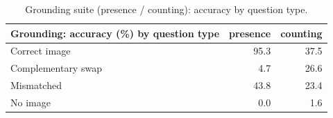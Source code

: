\begin{table}[t]
\centering\small
\begin{tabular}{lrr}
\toprule
Grounding: accuracy (\%) by question type & presence & counting \\
\midrule
Correct image & 95.3 & 37.5 \\
Complementary swap & 4.7 & 26.6 \\
Mismatched & 43.8 & 23.4 \\
No image & 0.0 & 1.6 \\
\bottomrule
\end{tabular}
\caption{Grounding suite (presence / counting): accuracy by question type.}
\label{tab:task2_grounding_suite_types}
\end{table}
